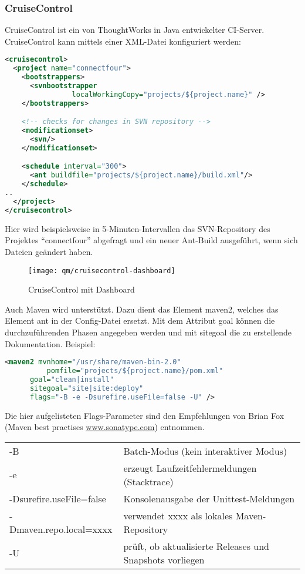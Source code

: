 \subsubsection{CruiseControl}
CruiseControl ist ein von ThoughtWorks in Java entwickelter
CI-Server.
CruiseControl kann mittels einer XML-Datei konfiguriert werden:
\begin{lstlisting}[language=xml,
morekeywords={cruisecontrol,project,bootstrappers,svnbootstrapper,modificationset,svn,schedule,ant}]
<cruisecontrol>
  <project name="connectfour">
    <bootstrappers>
      <svnbootstrapper
                localWorkingCopy="projects/${project.name}" />
    </bootstrappers>

    <!-- checks for changes in SVN repository -->
    <modificationset>
      <svn/>
    </modificationset>

    <schedule interval="300">
      <ant buildfile="projects/${project.name}/build.xml"/>
    </schedule>
..
  </project>
</cruisecontrol>
\end{lstlisting}
Hier wird beispielsweise in 5-Minuten-Intervallen das SVN-Repository
des Projektes ``connectfour'' abgefragt und ein neuer Ant-Build
ausgeführt, wenn sich Dateien geändert haben.
\begin{figure}[H]
\texttt{[image: qm/cruisecontrol-dashboard]}
\caption{CruiseControl mit Dashboard}
%
\label{fig:cruisecontrol}
\end{figure}
\newslide
Auch Maven wird unterstützt. Dazu dient das Element maven2, welches
das Element ant in der Config-Datei ersetzt. Mit dem Attribut goal können die
durchzuführenden Phasen angegeben werden und mit sitegoal die zu
erstellende Dokumentation. Beispiel:
\begin{lstlisting}[language=xml,morekeywords={maven2}]
  <maven2 mvnhome="/usr/share/maven-bin-2.0"
          pomfile="projects/${project.name}/pom.xml"
	  goal="clean|install"
	  sitegoal="site|site:deploy"
	  flags="-B -e -Dsurefire.useFile=false -U" />
\end{lstlisting}
\newslide
Die hier aufgelisteten Flags-Parameter sind den Empfehlungen von
Brian Fox (Maven best practises
  \href{http://www.sonatype.com}{www.sonatype.com}) entnommen.
\begin{center}
\begin{tabular}{ll}
 -B & Batch-Modus (kein interaktiver Modus)\\
 -e & erzeugt Laufzeitfehlermeldungen (Stacktrace)\\
 -Dsurefire.useFile=false & Konsolenausgabe der Unittest-Meldungen\\
 -Dmaven.repo.local=xxxx & verwendet xxxx als lokales Maven-Repository\\
 -U & prüft, ob aktualisierte Releases und Snapshots vorliegen\\
\end{tabular}
\end{center}
